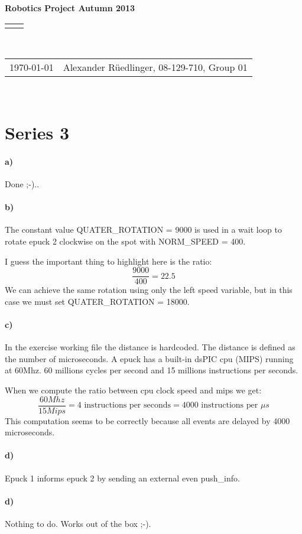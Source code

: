 \documentclass[12pt]{article}
\renewcommand{\title}[1]{\textbf{#1}\\}
\renewcommand{\line}{\begin{tabularx}{\textwidth}{X>{\raggedleft}X}\hline\\\end{tabularx}\\[-0.5cm]}
\newcommand{\leftright}[2]{\begin{tabularx}{\textwidth}{X>{\raggedleft}X}#1%
& #2\\\end{tabularx}\\[-0.5cm]}
\begin{document}
\title{Robotics Project  Autumn 2013}
\line
\leftright{\today}{Alexander Rüedlinger, 08-129-710, Group 01} %
\section*{Series 3}
\paragraph{a)} Done ;-)..

\paragraph{b)}
The constant value QUATER\_ROTATION = 9000 is used in a wait loop to rotate epuck 2 clockwise on the spot with NORM\_SPEED = 400.

I guess the important thing to highlight here is the ratio:
\begin{equation}
\frac{9000}{400} = 22.5
\end{equation}
We can achieve the same rotation using only the left speed variable, but in this case we must set QUATER\_ROTATION = 18000.

\paragraph{c)} In the exercise working file the distance is hardcoded. The distance is defined as the number of microseconds. A epuck has a built-in  dsPIC cpu (MIPS) running at  60Mhz. 60 millions cycles per second and 15 millions instructions per seconds.

When we compute the ratio between cpu clock speed and mips we get:
\begin{equation}
\frac{60Mhz}{15Mips} = 4 \text{ instructions per seconds} = 4000 \text{ instructions per } \mu s
\end{equation}
This computation seems to be correctly because all events are delayed by 4000 microseconds.

\paragraph{d)} Epuck 1 informs epuck 2 by sending an external even push\_info.

\paragraph{d)} Nothing to do. Works out of the box ;-).
\end{document}

